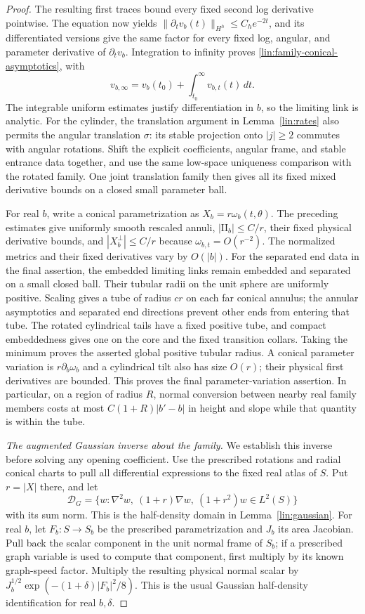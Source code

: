 \begin{proof}
The resulting first traces bound every fixed second log derivative
pointwise.  The equation now yields
$\|\partial_t v_b(t)\|_{H^h}\le C_h e^{-2t}$, and its differentiated
versions give the same factor for every fixed log, angular, and parameter
derivative of $\partial_t v_b$.  Integration to infinity proves
\eqref{lin:family-conical-asymptotics}, with
\[
 v_{b,\infty}=v_b(t_0)+\int_{t_0}^{\infty}v_{b,t}(t)\,dt.
\]
The integrable uniform estimates justify differentiation in $b$, so the
limiting link is analytic.  For the cylinder, the translation argument in
Lemma~\ref{lin:rates} also permits the angular translation $\sigma$:
its stable projection onto $|j|\ge2$ commutes with angular rotations.
Shift the explicit coefficients, angular frame, and stable entrance data
together, and use the same low-space uniqueness comparison with the rotated
family.  One joint translation family then gives all its fixed mixed
derivative bounds on a closed small parameter ball.

For real $b$, write a conical parametrization as $X_b=r\omega_b(t,\theta)$.
The preceding estimates give uniformly smooth rescaled annuli,
$|\mathrm{II}_b|\le C/r$, their fixed physical derivative bounds, and
$|X_b^\perp|\le C/r$ because $\omega_{b,t}=O(r^{-2})$.
The normalized metrics and their fixed derivatives vary by $O(|b|)$.
For the separated end data in the final assertion, the embedded limiting
links remain embedded and separated on a small closed ball.  Their tubular
radii on the unit sphere are uniformly positive.  Scaling gives a tube
of radius $cr$ on each far conical annulus; the annular asymptotics and
separated end directions prevent other ends from entering that tube.
The rotated cylindrical tails have a fixed positive tube, and compact
embeddedness gives one on the core and the fixed transition collars.
Taking the minimum proves the asserted global positive tubular radius.
A conical parameter variation is $r\partial_b\omega_b$ and a cylindrical
tilt also has size $O(r)$; their physical first derivatives are bounded.
This proves the final parameter-variation assertion.  In particular, on
a region of radius $R$, normal conversion between nearby real family
members costs at most $C(1+R)|b'-b|$ in height and slope while that quantity
is within the tube.

\emph{The augmented Gaussian inverse about the family.}
We establish this inverse before solving any opening coefficient.
Use the prescribed rotations and radial conical charts to pull all
differential expressions to the fixed real atlas of $S$.  Put $r=|X|$
there, and let
\[
 \mathcal D_G=\{w:\nabla^2w,\ (1+r)\nabla w,\ (1+r^2)w\in L^2(S)\}
\]
with its sum norm.  This is the half-density domain in
Lemma~\ref{lin:gaussian}.  For real $b$, let $F_b:S\to S_b$ be the
prescribed parametrization and $J_b$ its area Jacobian.  Pull back the
scalar component in the unit normal frame of $S_b$; if a prescribed graph
variable is used to compute that component, first multiply by its known
graph-speed factor.  Multiply the resulting physical normal scalar by
$J_b^{1/2}\exp(-(1+\delta)|F_b|^2/8)$.  This is the usual Gaussian
half-density identification for real $b,\delta$.


\end{proof}
